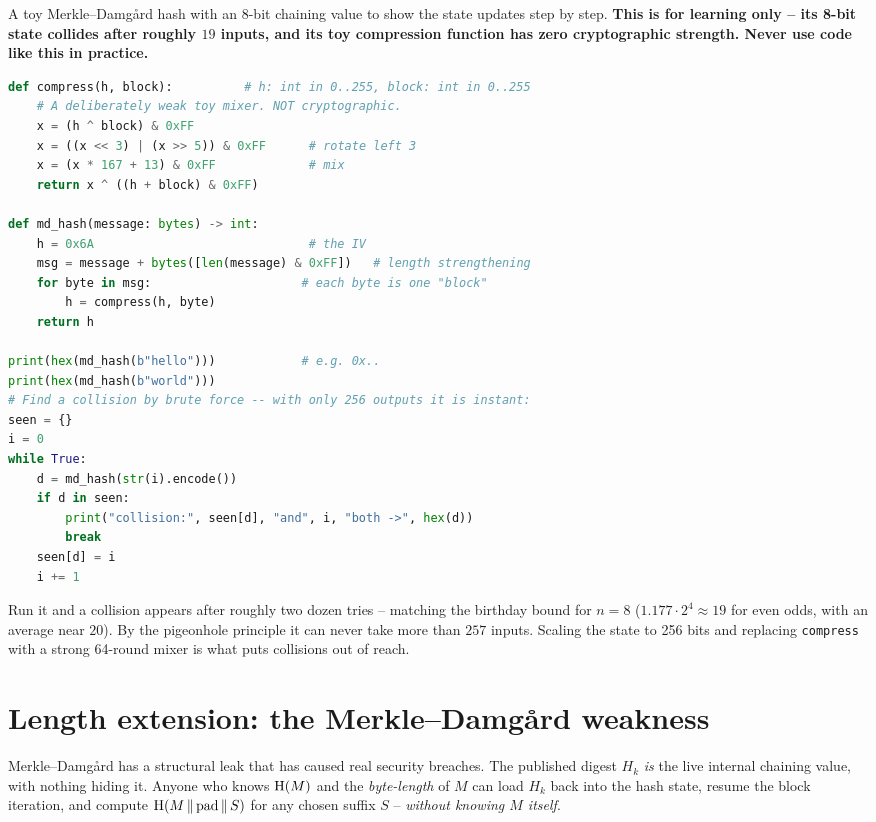 \begin{implementbox}
A toy Merkle--Damg\aa{}rd hash with an 8-bit chaining value to show the state updates step by step. \textbf{This is for learning only -- its 8-bit state collides after roughly $19$ inputs, and its toy compression function has zero cryptographic strength. Never use code like this in practice.}
\begin{lstlisting}[language=Python]
def compress(h, block):          # h: int in 0..255, block: int in 0..255
    # A deliberately weak toy mixer. NOT cryptographic.
    x = (h ^ block) & 0xFF
    x = ((x << 3) | (x >> 5)) & 0xFF      # rotate left 3
    x = (x * 167 + 13) & 0xFF             # mix
    return x ^ ((h + block) & 0xFF)

def md_hash(message: bytes) -> int:
    h = 0x6A                              # the IV
    msg = message + bytes([len(message) & 0xFF])   # length strengthening
    for byte in msg:                     # each byte is one "block"
        h = compress(h, byte)
    return h

print(hex(md_hash(b"hello")))            # e.g. 0x..
print(hex(md_hash(b"world")))
# Find a collision by brute force -- with only 256 outputs it is instant:
seen = {}
i = 0
while True:
    d = md_hash(str(i).encode())
    if d in seen:
        print("collision:", seen[d], "and", i, "both ->", hex(d))
        break
    seen[d] = i
    i += 1
\end{lstlisting}
Run it and a collision appears after roughly two dozen tries -- matching the birthday bound for $n = 8$ ($1.177\cdot 2^{4} \approx 19$ for even odds, with an average near $20$). By the pigeonhole principle it can never take more than $257$ inputs. Scaling the state to 256 bits and replacing \texttt{compress} with a strong 64-round mixer is what puts collisions out of reach.
\end{implementbox}

\section{Length extension: the Merkle--Damg\aa{}rd weakness}
\label{ch14:length-ext}

Merkle--Damg\aa{}rd has a structural leak that has caused real security breaches. The published digest $H_k$ \emph{is} the live internal chaining value, with nothing hiding it. Anyone who knows $\operatorname{H}(M)$ and the \emph{byte-length} of $M$ can load $H_k$ back into the hash state, resume the block iteration, and compute $\operatorname{H}(M \,\|\, \text{pad} \,\|\, S)$ for any chosen suffix $S$ -- \emph{without knowing $M$ itself}.


